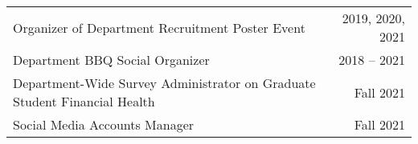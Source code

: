 \documentclass[letterpaper,11pt]{article}
\begin{document}
\begin{longtable}{@{}p{}r@{}}
  \hspace{7mm} Organizer of Department Recruitment Poster Event                                                                                                                                                   & 2019, 2020, 2021                                                            \\ [3pt]
  \hspace{7mm} Department BBQ Social Organizer                                                                                                                                                                    & 2018 -- 2021                                                                \\ [3pt]
  \hspace{7mm} Department-Wide Survey Administrator on Graduate Student Financial Health                                                                                                                          & Fall 2021                                                                   \\ [3pt]
  \hspace{7mm} Social Media Accounts Manager                                                                                                                                                                      & Fall 2021                                                                   \\ [8pt]


\end{longtable}
\end{document}
